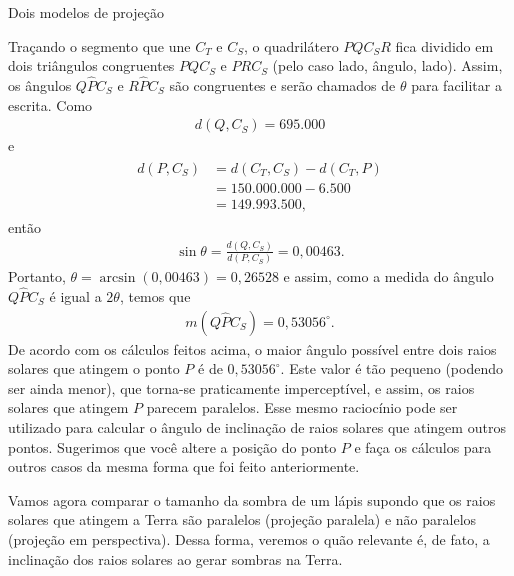 \begin{answer}{Dois modelos de projeção}
{\begin{enumerate}
Traçando o segmento que une \(C_T\) e \(C_S\), o quadrilátero \(PQC_SR\) fica dividido em dois triângulos congruentes \(PQC_S\) e \(PRC_S\) (pelo caso lado, ângulo, lado). Assim, os ângulos \(Q\hat{P}C_S\) e \(R\hat{P}C_S\) são congruentes e serão chamados de \(\theta\) para facilitar a escrita. Como
\begin{equation*}
\begin{split}d(Q,C_S)= 695.000\end{split}
\end{equation*}
e
\begin{equation*}
\begin{split}\begin{array}{ll}
d(P,C_S) & = d(C_T, C_S)-d(C_T,P)\\
      &= 150.000.000-6.500\\
      &=149.993.500,
\end{array}\end{split}
\end{equation*}
então
\begin{equation*}
\begin{split}\sin\theta = \frac{d(Q,C_S)}{d(P,C_S)}=0{,}00463.\end{split}
\end{equation*}
Portanto, \(\theta=\arcsin(0,00463) = 0{,}26528\) e assim, como a medida do ângulo \(Q\hat{P}C_S\) é igual a \(2\theta\), temos que
\begin{equation*}
\begin{split}m(Q\hat{P}C_S)=0{,}53056^\circ.\end{split}
\end{equation*}
De acordo com os cálculos feitos acima, o maior ângulo  possível entre dois raios solares que atingem o ponto \(P\) é de \(0{,}53056^\circ\). Este valor é tão pequeno (podendo ser ainda menor), que torna-se praticamente imperceptível, e assim, os raios solares que atingem \(P\) parecem paralelos. Esse mesmo raciocínio pode ser utilizado para calcular o ângulo de inclinação de raios solares que atingem outros pontos. Sugerimos que você altere a posição do ponto \(P\) e faça os cálculos para outros casos da mesma forma que foi feito anteriormente.

Vamos agora comparar o tamanho da sombra de um lápis supondo que os raios solares que atingem a Terra são paralelos (projeção paralela) e não paralelos (projeção em perspectiva). Dessa forma, veremos o quão relevante é, de fato, a inclinação dos raios solares ao gerar sombras na Terra.


\end{enumerate}}
\end{answer}
